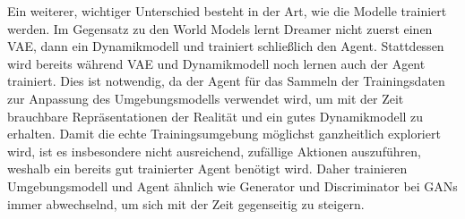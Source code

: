 Ein weiterer, wichtiger Unterschied besteht in der Art, wie die Modelle trainiert werden.
Im Gegensatz zu den World Models lernt Dreamer nicht zuerst einen VAE, dann ein
Dynamikmodell und trainiert schließlich den Agent. Stattdessen wird bereits während VAE
und Dynamikmodell noch lernen auch der Agent trainiert. Dies ist notwendig, da der Agent
für das Sammeln der Trainingsdaten zur Anpassung des Umgebungsmodells verwendet wird,
um mit der Zeit brauchbare Repräsentationen der Realität und ein gutes Dynamikmodell
zu erhalten. Damit die echte Trainingsumgebung möglichst ganzheitlich exploriert wird,
ist es insbesondere nicht ausreichend, zufällige Aktionen auszuführen, weshalb ein bereits
gut trainierter Agent benötigt wird. Daher trainieren Umgebungsmodell und Agent ähnlich
wie Generator und Discriminator bei GANs immer abwechselnd, um sich mit der Zeit
gegenseitig zu steigern.
